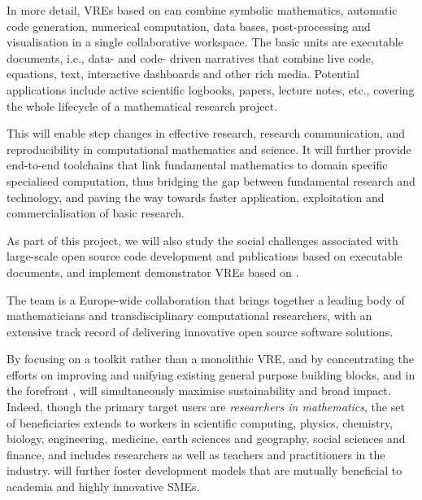 In more detail, VREs based on \TheProject can combine symbolic
mathematics, automatic code generation, numerical computation, data
bases, post-processing and visualisation in a single collaborative
workspace. The basic units are executable documents, i.e., data- and
code- driven narratives that combine live code, equations, text,
interactive dashboards and other rich media. Potential applications
include active scientific logbooks, papers, lecture notes, etc.,
covering the whole lifecycle of a mathematical research project.

This will enable step changes in effective research, research
communication, and reproducibility in computational mathematics and
science. It will further provide end-to-end toolchains that link
fundamental mathematics to domain specific specialised computation,
thus bridging the gap between fundamental research and technology, and
paving the way towards faster application, exploitation and
commercialisation of basic research.

As part of this project, we will also study the social challenges
associated with large-scale open source code development and
publications based on executable documents, and implement
demonstrator VREs based on \TheProject.

The \TheProject team is a Europe-wide collaboration that brings
together a leading body of mathematicians and transdisciplinary
computational researchers, with an extensive track record of
delivering innovative open source software solutions.

By focusing on a toolkit rather than a monolithic VRE, and by
concentrating the efforts on improving and unifying existing general
purpose building blocks, and in the forefront \Jupyter, \TheProject
will simultaneously maximise sustainability and broad impact. Indeed,
though the primary target users are \emph{researchers in
  mathematics}, the set of beneficiaries extends to workers in scientific
computing, physics, chemistry, biology, engineering, medicine, earth
sciences and geography, social sciences and finance, and includes researchers as well as teachers
and practitioners in the industry. \TheProject will further foster
development models that are mutually beneficial to academia and highly
innovative SMEs.






\clearpage


